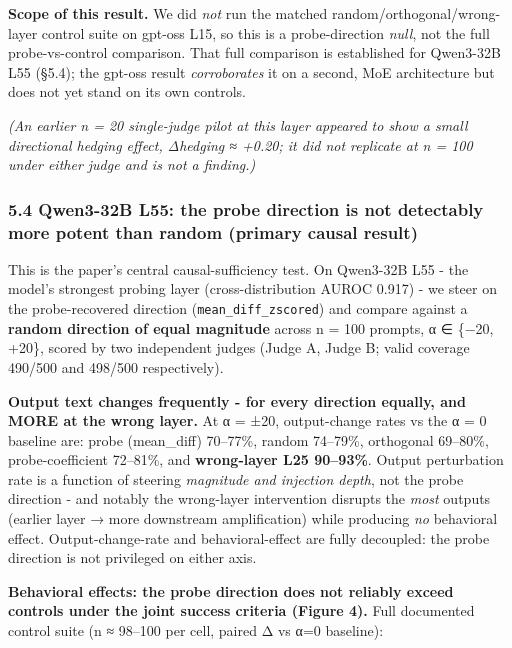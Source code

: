 \documentclass[
]{article}
\begin{document}
\textbf{Scope of this result.} We did \emph{not} run the matched
random/orthogonal/wrong-layer control suite on gpt-oss L15, so this is a
probe-direction \emph{null}, not the full probe-vs-control comparison.
That full comparison is established for Qwen3-32B L55 (§5.4); the
gpt-oss result \emph{corroborates} it on a second, MoE architecture but
does not yet stand on its own controls.

\emph{(An earlier n = 20 single-judge pilot at this layer appeared to
show a small directional hedging effect, Δhedging ≈ +0.20; it did not
replicate at n = 100 under either judge and is not a finding.)}

\subsubsection{5.4 Qwen3-32B L55: the probe direction is not detectably
more potent than random (primary causal
result)}\label{qwen3-32b-l55-the-probe-direction-is-not-detectably-more-potent-than-random-primary-causal-result}

This is the paper's central causal-sufficiency test. On Qwen3-32B L55 -
the model's strongest probing layer (cross-distribution AUROC 0.917) -
we steer on the probe-recovered direction (\texttt{mean\_diff\_zscored})
and compare against a \textbf{random direction of equal magnitude}
across n = 100 prompts, α ∈ \{−20, +20\}, scored by two independent
judges (Judge A, Judge B; valid coverage 490/500 and 498/500
respectively).

\textbf{Output text changes frequently - for every direction equally,
and MORE at the wrong layer.} At α = ±20, output-change rates vs the α =
0 baseline are: probe (mean\_diff) 70--77\%, random 74--79\%, orthogonal
69--80\%, probe-coefficient 72--81\%, and \textbf{wrong-layer L25
90--93\%}. Output perturbation rate is a function of steering
\emph{magnitude and injection depth}, not the probe direction - and
notably the wrong-layer intervention disrupts the \emph{most} outputs
(earlier layer → more downstream amplification) while producing
\emph{no} behavioral effect. Output-change-rate and behavioral-effect
are fully decoupled: the probe direction is not privileged on either
axis.

\textbf{Behavioral effects: the probe direction does not reliably exceed
controls under the joint success criteria (Figure 4).} Full documented
control suite (n ≈ 98--100 per cell, paired Δ vs α=0 baseline):
\end{document}
